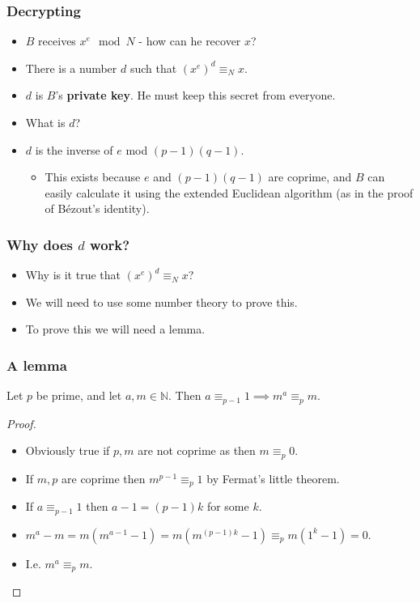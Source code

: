 \documentclass[handout]{beamer}
\newcommand{\bN}{\mathbb{N}}
\begin{document}
\begin{frame}
\frametitle{Decrypting}
\begin{itemize}
\item $B$ receives $x^e \mod N$ - how can he recover $x$?
\vspace{.5cm}
\item There is a number $d$ such that $(x^e)^d \equiv_N x$.
\vspace{.5cm}
\item $d$ is $B$'s \textbf{private key}. He must keep this secret from everyone.
\vspace{.1cm}
\item What is $d$?
\vspace{.5cm}
\item $d$ is the inverse of $e$ mod $(p-1)(q-1)$. 
\begin{itemize}
\item This exists because $e$ and $(p-1)(q-1)$ are coprime, and $B$ can easily calculate it using the extended Euclidean algorithm (as in the proof of B\'ezout's identity).
\end{itemize}
\end{itemize}
\end{frame}

\begin{frame}
\frametitle{Why does $d$ work?}
\begin{itemize}
\item Why is it true that $(x^e)^d \equiv_N x$?
\vspace{1cm}
\item We will need to use some number theory to prove this.
\vspace{1cm}
\item To prove this we will need a lemma.
\end{itemize}
\end{frame}

\begin{frame}
\frametitle{A lemma}
\begin{lemma}
Let $p$ be prime, and let $a,m\in\bN$. Then $a\equiv_{p-1} 1\implies m^a\equiv_p m$.
\end{lemma}
\begin{proof}
\begin{itemize}
\item Obviously true if $p,m$ are not coprime as then $m \equiv_p 0$.
\item If $m,p$ are coprime then $m^{p-1}\equiv_p 1$ by Fermat's little theorem.
\item If $a\equiv_{p-1} 1$ then $a -1 = (p-1)k$ for some $k$.
\item $m^a - m = m(m^{a-1} - 1) = m(m^{(p-1)k}-1) \equiv_p m(1^k - 1) = 0$.
\item I.e. $m^a\equiv_p m$.
\end{itemize}
\end{proof}
\end{frame}
\end{document}
